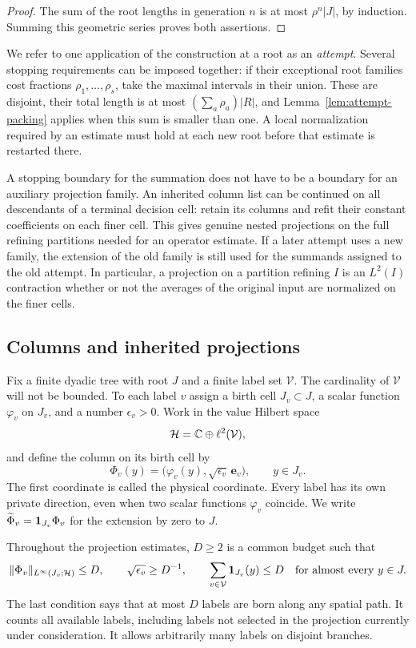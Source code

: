 \begin{proof}
The sum of the root lengths in generation $n$ is at most $\rho^n|J|$, by
induction.  Summing this geometric series proves both assertions.
\end{proof}

We refer to one application of the construction at a root as an
\emph{attempt}.  Several stopping requirements can be imposed together: if
their exceptional root families cost fractions $\rho_1,\ldots,\rho_s$, take
the maximal intervals in their union.  These are disjoint, their total length
is at most $(\sum_a\rho_a)|R|$, and Lemma~\ref{lem:attempt-packing}
applies when this sum
is smaller than one.  A local normalization required by an estimate must hold
at each new root before that estimate is restarted there.

A stopping boundary for the summation does not have to be a boundary for an
auxiliary projection family.  An inherited column list can be continued on
all descendants of a terminal decision cell: retain its columns and refit
their constant coefficients on each finer cell.  This gives genuine nested
projections on the full refining partitions needed for an operator estimate.
If a later attempt uses a new family, the extension of the old family is
still used for the summands assigned to the old attempt.  In particular, a
projection on a partition refining $I$ is an $L^2(I)$ contraction whether or
not the averages of the original input are normalized on the finer cells.

\subsection{Columns and inherited projections}

Fix a finite dyadic tree with root $J$ and a finite label set $\mathcal V$.
The cardinality of $\mathcal V$ will not be bounded.  To each label $v$ assign
a birth cell $J_v\subset J$, a scalar function $\varphi_v$ on $J_v$, and a
number $\epsilon_v>0$.  Work in the value Hilbert space
\[
 \mathcal H=\mathbb C\oplus\ell^2(\mathcal V),
\]
and define the column on its birth cell by
\[
 \Phi_v(y)=\bigl(\varphi_v(y),\sqrt{\epsilon_v}\,\mathbf e_v\bigr),
 \qquad y\in J_v.
\]
The first coordinate is called the physical coordinate.  Every label has its
own private direction, even when two scalar functions $\varphi_v$ coincide.
We write $\widetilde\Phi_v=\mathbf 1_{J_v}\Phi_v$ for the extension by zero to $J$.

Throughout the projection estimates, $D\ge2$ is a common budget such that
\begin{equation*}
 \|\Phi_v\|_{L^\infty(J_v;\mathcal H)}\le D,
 \qquad \sqrt{\epsilon_v}\ge D^{-1},
 \qquad \sum_{v\in\mathcal V}\mathbf 1_{J_v}(y)\le D
       \quad\text{for almost every }y\in J.
\end{equation*}
The last condition says that at most $D$ labels are born along any spatial
path.  It counts all available labels, including labels not selected in the
projection currently under consideration.  It allows arbitrarily many labels
on disjoint branches.

